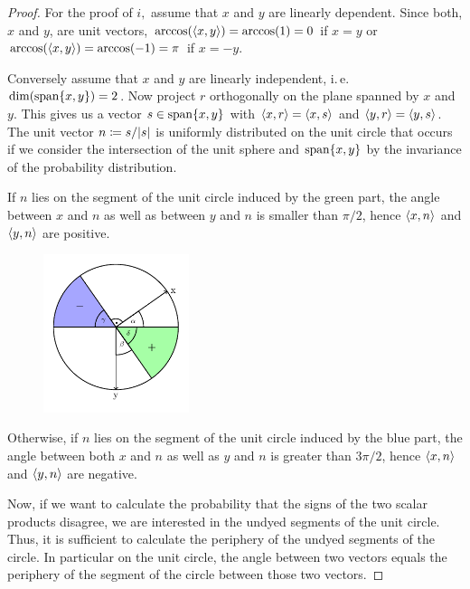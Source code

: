 	\begin{proof}
		For the proof of $i,$ assume that $x$ and $y$ are linearly dependent. Since both, $x$ and $y$, are unit vectors, $\arccos(\langle{x},{y}\rangle) = \arccos(1)=0$ if $x=y$ or $\arccos(\langle{x},{y}\rangle) = \arccos(-1) = \pi$ if $x=-y$.
		
		Conversely assume that $x$ and $y$ are linearly independent, i.\,e. $\operatorname{dim}(\operatorname{span}\{x,y\})=2$. Now project $r$ orthogonally on the plane spanned by $x$ and $y$. This gives us a vector $s\in \operatorname{span}\{x,y\}$ with $\langle{x},{r}\rangle = \langle{x},{s}\rangle$ and $\langle{y},{r}\rangle = \langle{y},{s}\rangle$. The unit vector $n\coloneqq s/{\left|{s}\right|}$ is uniformly distributed on the unit circle that occurs if we consider the intersection of the unit sphere and $\operatorname{span}\{x,y\}$ by the invariance of the probability distribution. \\
		
		\noindent\begin{minipage}{\textwidth}	
			If $n$ lies on the segment of the unit circle induced by the green part, the angle between $x$ and $n$ as well as between $y$ and $n$ is smaller than $\pi/2$, hence $\langle{x},{n}\rangle$ and $\langle{y},{n}\rangle$ are positive. 
			\begin{figure}
				\vspace{-20pt}
				\begin{center}
					\includegraphics[width=0.38\textwidth]{chapters/fig_unit_circle.pdf}
				\end{center}
				\vspace{-20pt}
			\end{figure}
			Otherwise, if $n$ lies on the segment of the unit circle induced by the blue part, the angle between both $x$ and $n$ as well as $y$ and $n$ is greater than $3\pi/2$, hence $\langle{x},{n}\rangle$ and $\langle{y},{n}\rangle$ are negative.
			
			\hspace{12pt} Now, if we want to calculate the probability that the signs of the two scalar products disagree, we are interested in the undyed segments of the unit circle. Thus, it is sufficient to calculate the periphery of the undyed segments of the circle. In particular on the unit circle, the angle between two vectors equals the periphery of the segment of the circle between those two vectors. 
				

\end{minipage}
\end{proof}
